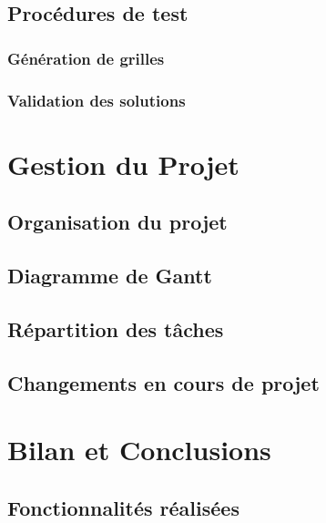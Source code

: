 \documentclass[a4paper]{article}
\begin{document}
\subsection{Procédures de test}

\subsubsection{Génération de grilles}

\subsubsection{Validation des solutions}

\vspace{0.5cm}

\section{Gestion du Projet}

\subsection{Organisation du projet}

\subsection{Diagramme de Gantt}

\subsection{Répartition des tâches}

\subsection{Changements en cours de projet}

\vspace{0.5cm}

\section{Bilan et Conclusions}

\subsection{Fonctionnalités réalisées}
\end{document}
